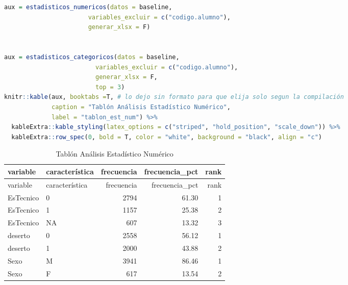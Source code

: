 \begin{lstlisting}[language=R]
aux = estadisticos_numericos(datos = baseline,
                       variables_excluir = c("codigo.alumno"),
                       generar_xlsx = F)


aux = estadisticos_categoricos(datos = baseline,
                         variables_excluir = c("codigo.alumno"),
                         generar_xlsx = F,
                         top = 3)
knitr::kable(aux, booktabs =T, # lo dejo sin formato para que elija solo segun la compilación
             caption = "Tablón Análisis Estadístico Numérico",
             label = "tablon_est_num") %>%
  kableExtra::kable_styling(latex_options = c("striped", "hold_position", "scale_down")) %>%
  kableExtra::row_spec(0, bold = T, color = "white", background = "black", align = "c")
\end{lstlisting}

\begin{longtable}[]{@{}llrrr@{}}
\caption{ Tablón Análisis Estadístico Numérico }\tabularnewline
\toprule
variable & característica & frecuencia & frecuencia\_pct &
rank\tabularnewline
\midrule
\endfirsthead
\toprule
variable & característica & frecuencia & frecuencia\_pct &
rank\tabularnewline
\midrule
\endhead
EsTecnico & 0 & 2794 & 61.30 & 1\tabularnewline
EsTecnico & 1 & 1157 & 25.38 & 2\tabularnewline
EsTecnico & NA & 607 & 13.32 & 3\tabularnewline
deserto & 0 & 2558 & 56.12 & 1\tabularnewline
deserto & 1 & 2000 & 43.88 & 2\tabularnewline
Sexo & M & 3941 & 86.46 & 1\tabularnewline
Sexo & F & 617 & 13.54 & 2\tabularnewline
\bottomrule
\end{longtable}








